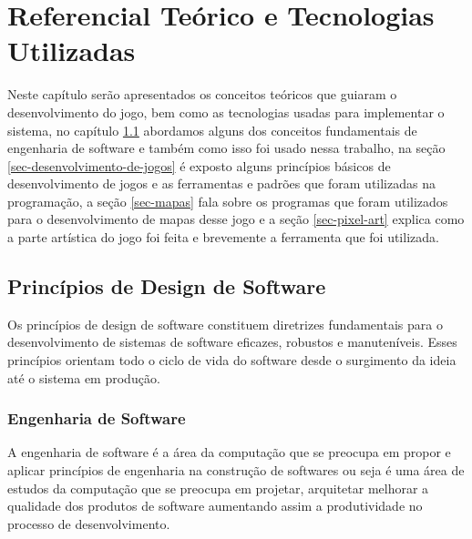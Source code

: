 \chapter{Referencial Teórico e Tecnologias Utilizadas}
\label{sec-referencial}
Neste capítulo serão apresentados os conceitos teóricos que guiaram o desenvolvimento do jogo, bem como as tecnologias usadas para implementar o sistema, no capítulo \ref{sec-principios-de-design-de-software} abordamos alguns dos conceitos fundamentais de engenharia de software e também como isso foi usado nessa trabalho, na seção \ref{sec-desenvolvimento-de-jogos} é exposto alguns princípios básicos de desenvolvimento de jogos e as ferramentas e padrões que foram utilizadas na programação, a seção \ref{sec-mapas} fala sobre os programas que foram utilizados para o desenvolvimento de mapas desse jogo e a seção \ref{sec-pixel-art} explica como a parte artística do jogo foi feita e brevemente a ferramenta que foi utilizada.

\section{Princípios de Design de Software}
\label{sec-principios-de-design-de-software}
Os princípios de design de software constituem diretrizes fundamentais para o desenvolvimento de sistemas de software eficazes, robustos e manuteníveis. Esses princípios orientam todo o ciclo de vida do software desde o surgimento da ideia até o sistema em produção. 
\subsection{Engenharia de Software}
A engenharia de software é a área da computação que se preocupa em propor e aplicar princípios de engenharia na construção de softwares\cite{EngSoftMod} ou seja é uma área de estudos da computação que se preocupa em projetar, arquitetar melhorar a qualidade dos produtos de software aumentando assim a produtividade no processo de desenvolvimento. 

